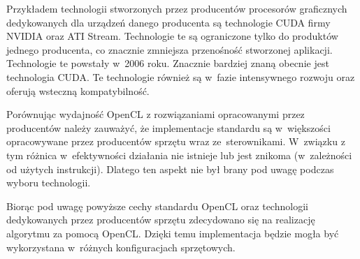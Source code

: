 Przykładem technologii stworzonych przez producentów procesorów graficznych dedykowanych dla urządzeń danego producenta są technologie CUDA firmy NVIDIA oraz ATI Stream. Technologie te są ograniczone tylko do produktów jednego producenta, co znacznie zmniejsza przenośność stworzonej aplikacji. Technologie te powstały w~2006 roku. Znacznie bardziej znaną obecnie jest technologia CUDA. Te technologie również są w~fazie intensywnego rozwoju oraz oferują wsteczną kompatybilność.

Porównując wydajność OpenCL z rozwiązaniami opracowanymi przez producentów należy zauważyć, że implementacje standardu są w~większości opracowywane przez producentów sprzętu wraz ze~sterownikami. W~związku z tym różnica w~efektywności działania nie istnieje lub jest znikoma (w~zależności od użytych instrukcji). Dlatego ten aspekt nie był brany pod uwagę podczas wyboru technologii.

Biorąc pod uwagę powyższe cechy standardu OpenCL oraz technologii dedykowanych przez producentów sprzętu zdecydowano się na realizację algorytmu za pomocą OpenCL. Dzięki temu implementacja będzie mogła być wykorzystana w~różnych konfiguracjach sprzętowych.



